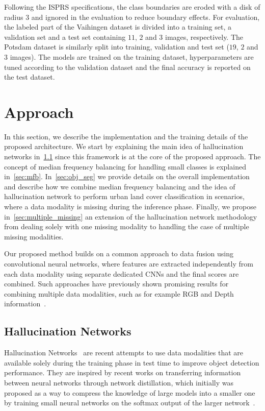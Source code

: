 \documentclass[journal]{IEEEtran}
\begin{document}
Following the ISPRS specifications, the class boundaries are eroded with a disk of radius 3 and ignored in the evaluation to reduce boundary effects.
For evaluation, the labeled part of the Vaihingen dataset is divided into a training set, a validation set and a test set containing $11$, $2$ and $3$ images, respectively. The Potsdam dataset is similarly split into training, validation and test set ($19$, $2$ and $3$ images). The models are trained on the training dataset, hyperparameters are tuned according to the validation dataset and the final accuracy is reported on the test dataset.

\section{Approach}
\label{approach}
In this section, we describe the implementation and the training details of the proposed architecture. We start by explaining the main idea of hallucination networks in~\ref{sec:hal} since this framework is at the core of the proposed approach. The concept of median frequency balancing for handling small classes is explained in~\ref{sec:mfb}. In~\ref{sec:obj_seg} we provide details on the overall implementation and describe how we combine median frequency balancing and the idea of hallucination network to perform urban land cover classification in scenarios, where a data modality is missing during the inference phase. Finally, we propose in~\ref{sec:multiple_missing} an extension of the hallucination network methodology from dealing solely with one missing modality to handling the case of multiple missing modalities.

Our proposed method builds on a common approach to data fusion using convolutional neural networks, where features are extracted independently from each data modality using separate dedicated CNNs and the final scores are combined. Such approaches have previously shown promising results for combining multiple data modalities, such as for example RGB and Depth information~\cite{gupta2014learning, audebert2017fusion}.


\subsection{Hallucination Networks}
\label{sec:hal}
Hallucination Networks~\cite{Hoffman_2016_CVPR} are recent attempts to use data modalities that are available solely during the training phase in test time to improve object detection performance. They are inspired by recent works on transferring information between neural networks through network distillation, which initially was proposed as a way to compress the knowledge of large models into a smaller one by training small neural networks on the softmax output of the larger network~\cite{hinton2015distilling}. 
\end{document}

